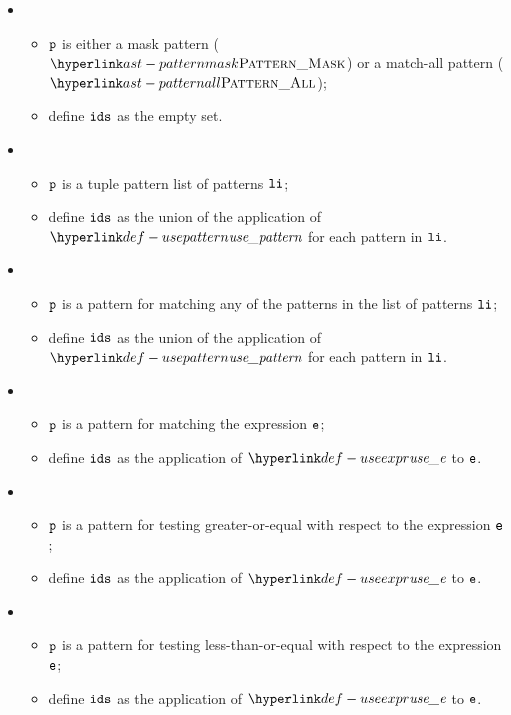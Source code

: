 \ProseParagraph
\OneApplies
\begin{itemize}
  \item {}
  \begin{itemize}
    \item $\texttt{p}$ is either a mask pattern ($\PatternMask$) or a match-all pattern ($\PatternAll$);
    \item define $\texttt{ids}$ as the empty set.
  \end{itemize}

  \item {}
  \begin{itemize}
    \item $\texttt{p}$ is a tuple pattern list of patterns $\texttt{li}$;
    \item define $\texttt{ids}$ as the union of the application of $\usepattern$ for each pattern in $\texttt{li}$.
  \end{itemize}

  \item {}
  \begin{itemize}
    \item $\texttt{p}$ is a pattern for matching any of the patterns in the list of patterns $\texttt{li}$;
    \item define $\texttt{ids}$ as the union of the application of $\usepattern$ for each pattern in $\texttt{li}$.
  \end{itemize}

  \item {}
  \begin{itemize}
    \item $\texttt{p}$ is a pattern for matching the expression $\texttt{e}$;
    \item define $\texttt{ids}$ as the application of $\useexpr$ to $\texttt{e}$.
  \end{itemize}

  \item {}
  \begin{itemize}
    \item $\texttt{p}$ is a pattern for testing greater-or-equal with respect to the expression $\texttt{e}$;
    \item define $\texttt{ids}$ as the application of $\useexpr$ to $\texttt{e}$.
  \end{itemize}

  \item {}
  \begin{itemize}
    \item $\texttt{p}$ is a pattern for testing less-than-or-equal with respect to the expression $\texttt{e}$;
    \item define $\texttt{ids}$ as the application of $\useexpr$ to $\texttt{e}$.
  \end{itemize}


\end{itemize}
